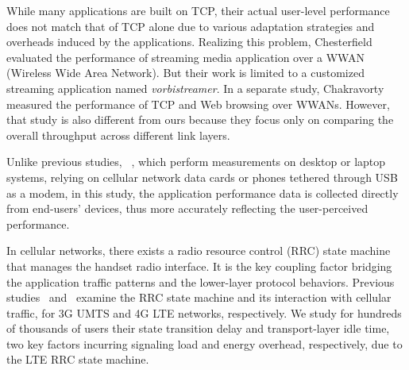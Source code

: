 While many applications are built on TCP, their actual user-level performance does not match that of TCP alone due to various adaptation strategies and overheads induced by the applications. Realizing this problem, Chesterfield \etal~\cite{Chesterfield:3GMultimedia:Monet2004} evaluated the performance of streaming media application over a WWAN (Wireless Wide Area Network). But their work is limited to a customized streaming application named {\em vorbistreamer}. In a separate study, Chakravorty \etal~\cite{Chakravorty:WWAN:Mobicom2004} measured the performance of TCP and Web browsing over WWANs. However, that study is also different from ours because they focus only on comparing the overall throughput across different link layers.

Unlike previous studies, \eg~\cite{Liu:3GChannelAppl:Mobicom2008, Chakravorty:WWAN:Mobicom2004, Jang:3G:MICNET2009}, which perform measurements on desktop or laptop systems, relying on cellular network data cards or phones tethered through USB as a modem, in this study, the application performance data is collected directly from end-users' devices, thus more accurately reflecting the user-perceived performance.

In cellular networks, there exists a radio resource control (RRC) state machine that manages the handset radio interface. It is the key coupling factor bridging the application traffic patterns and the lower-layer protocol behaviors. Previous studies~\cite{imc.3g} and~\cite{huang_mobisys12} examine the RRC state machine and its interaction with cellular traffic, for 3G UMTS and 4G LTE networks, respectively. We study for hundreds of thousands of users their state transition delay and transport-layer idle time, two key factors incurring signaling load and energy overhead, respectively, due to the LTE RRC state machine.

